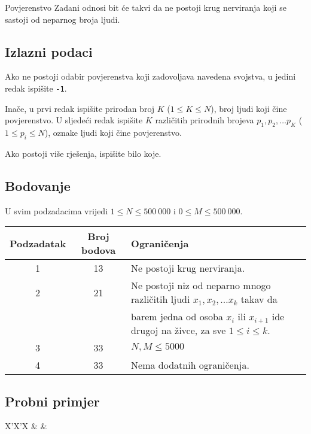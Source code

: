 \begin{statement}[
  problempoints=100,
  timelimit=1 sekunda,
  memorylimit=512 MiB,
]{Povjerenstvo}
Zadani odnosi bit će takvi da ne postoji krug nerviranja koji se sastoji od neparnog broja ljudi.

\subsection*{Izlazni podaci}

Ako ne postoji odabir povjerenstva koji zadovoljava navedena svojstva, u jedini redak ispišite \texttt{-1}.

Inače, u prvi redak ispišite prirodan broj $K$ ($1 \leq K \leq N$), broj ljudi koji čine povjerenstvo. U sljedeći redak ispišite $K$ različitih prirodnih brojeva $p_1, p_2, \dots p_K$ ($1 \leq p_i \leq N$), oznake ljudi koji čine povjerenstvo. 

Ako postoji više rješenja, ispišite bilo koje.

\subsection*{Bodovanje}

U svim podzadacima vrijedi $1 \leq N \leq 500~000$ i $0 \leq M \leq 500~000$.

{\renewcommand{\arraystretch}{1.4}
  \setlength{\tabcolsep}{6pt}
  \begin{tabular}{ccl}
   Podzadatak & Broj bodova & Ograničenja \\ \midrule
    1 & 13 & Ne postoji krug nerviranja. \\
    2 & 21 & Ne postoji niz od neparno mnogo različitih ljudi $x_1, x_2, \dots x_k$ takav da \\
      &    & barem jedna od osoba $x_i$ ili $x_{i+1}$ ide drugoj na živce, za sve $1 \leq i \leq k$. \\
    3 & 33 & $N, M \leq 5000$ \\
    4 & 33 & Nema dodatnih ograničenja.
\end{tabular}}

\subsection*{Probni primjer}
\begin{tabularx}{\textwidth}{X'X'X}
 &
 &
\end{tabularx}


\end{statement}

